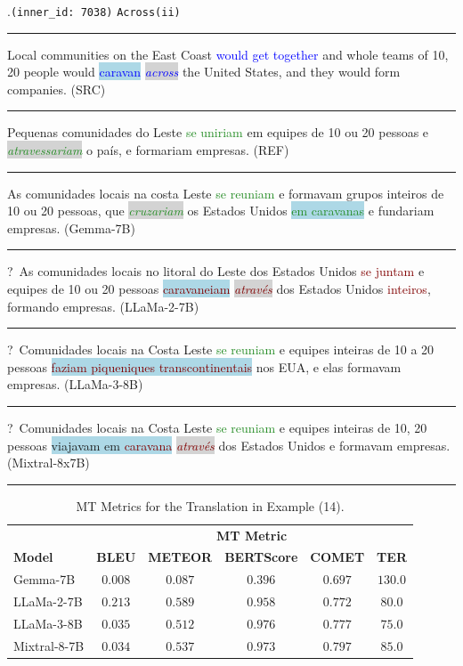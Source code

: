\ex.\texttt{(inner\_id: 7038)} \hfill  \texttt{Across(ii)} \\[0.3ex] \label{ex:ex-14}
\noindent\rule{\linewidth}{0.9pt}
Local communities on the East Coast \textcolor{blue}{would get together} and whole teams of 10, 20 people would \colorbox{lightblue}{\textcolor{blue}{caravan}}  \colorbox{lightgray}{\textcolor{blue}{\emph{across}}} the United States, and they would form companies. (SRC) \\[0.3ex]
\noindent\rule{\linewidth}{0.3pt}
Pequenas comunidades do Leste \textcolor{ForestGreen}{se uniriam} em equipes de 10 ou 20 pessoas e \colorbox{lightgray}{\textcolor{ForestGreen}{\emph{atravessariam}}} o país, e formariam empresas.  (REF) \\[0.3ex]
\noindent\rule{\linewidth}{0.3pt}
As comunidades locais na costa Leste \textcolor{ForestGreen}{se reuniam} e formavam grupos inteiros de 10 ou 20 pessoas, que \colorbox{lightgray}{\textcolor{ForestGreen}{\emph{cruzariam}}} os Estados Unidos \colorbox{lightblue}{\textcolor{ForestGreen}{em caravanas}} e fundariam empresas. (Gemma-7B) \\[0.3ex]
\noindent\rule{\linewidth}{0.3pt}
?~As comunidades locais no litoral do Leste dos Estados Unidos \textcolor{Maroon}{se juntam} e equipes de 10 ou 20 pessoas \colorbox{lightblue}{\textcolor{Maroon}{caravaneiam}} \colorbox{lightgray}{\textcolor{Maroon}{\emph{através}}} dos Estados Unidos \textcolor{Maroon}{inteiros}, formando empresas. (LLaMa-2-7B)  \\[0.3ex]
\noindent\rule{\linewidth}{0.3pt}
?~Comunidades locais na Costa Leste \textcolor{ForestGreen}{se reuniam} e equipes inteiras de 10 a 20 pessoas \colorbox{lightblue}{\textcolor{Maroon}{faziam piqueniques transcontinentais}} nos EUA, e elas formavam empresas. (LLaMa-3-8B)  \\[0.3ex]
\noindent\rule{\linewidth}{0.3pt} 
?~Comunidades locais na Costa Leste \textcolor{ForestGreen}{se reuniam} e equipes inteiras de 10, 20 pessoas \colorbox{lightblue}{viajavam em \textcolor{Maroon}{caravana}} \colorbox{lightgray}{\textcolor{Maroon}{\emph{através}}} dos Estados Unidos e formavam empresas. (Mixtral-8x7B) \\[0.3ex]
\noindent\rule{\linewidth}{0.9pt}


\begin{table}[htb]
\centering
\begin{tabular}{@{}lccccc@{}}
\toprule
& \multicolumn{5}{c}{\textbf{MT Metric}} \\
\textbf{Model} & \textbf{BLEU} & \textbf{METEOR} & \textbf{BERTScore} & \textbf{COMET} & \textbf{TER} \\
\midrule
Gemma-7B & $0.008$ & $0.087$ & $0.396$ & $0.697$ & $130.0$ \\
LLaMa-2-7B & $\mathbf{0.213}$ & $\mathbf{0.589}$ & $0.958$ & $0.772$ & $80.0$ \\
LLaMa-3-8B & $0.035$ & $0.512$ & $\mathbf{0.976}$ & $0.777$ & $\mathbf{75.0}$ \\
Mixtral-8-7B & $0.034$ & $0.537$ & $0.973$ & $\mathbf{0.797}$ & $85.0$ \\
\bottomrule
\end{tabular}
\caption{MT Metrics for the Translation in Example (14).}
\label{tab:final}
\end{table}

